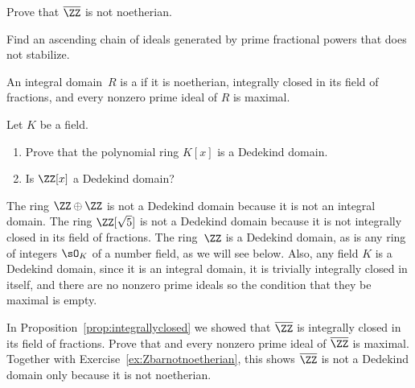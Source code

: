 \begin{exercise}\label{ex:Zbarnotnoetherian}
  Prove that $\overline{\ZZ}$ is not noetherian.

  \begin{hint}
    Find an ascending chain of ideals generated by prime fractional powers that does not stabilize.
  \end{hint}
\end{exercise}

\begin{definition}
  An integral domain~$R$ is a  if it is noetherian,
  integrally closed in its field of fractions, and every nonzero prime
  ideal of $R$ is maximal.
\end{definition}

\begin{exercise}
  Let $K$ be a field.
  \begin{enumerate}[label=(\alph*)]
    \item Prove that the polynomial ring $K[x]$ is a Dedekind domain.
    \item Is $\ZZ[x]$ a Dedekind domain?
  \end{enumerate}
\end{exercise}

The ring $\ZZ\oplus \ZZ$ is not a Dedekind domain because it is not an
integral domain.  The ring $\ZZ[\sqrt{5}]$ is not a Dedekind domain
because it is not integrally closed in its field of fractions.  The
ring~$\ZZ$ is a Dedekind domain, as is any ring of integers $\sO_K$ of a
number field, as we will see below.  Also, any field $K$ is a Dedekind
domain, since it is an integral domain, it is trivially integrally
closed in itself, and there are no nonzero prime ideals so the
condition that they be maximal is empty.

\begin{exercise}
  In Proposition~\ref{prop:integrallyclosed} we showed
  that $\overline{\ZZ}$ is integrally closed in its field of fractions.
  Prove that and every nonzero prime ideal of $\overline{\ZZ}$
  is maximal. Together with Exercise~\ref{ex:Zbarnotnoetherian},
  this shows $\overline{\ZZ}$ is not a Dedekind domain only because it
  is not noetherian.
\end{exercise}

